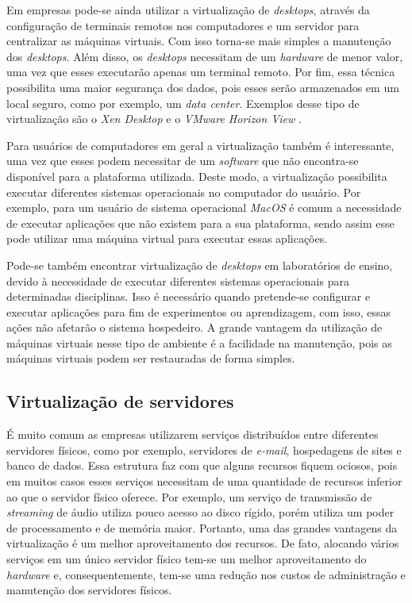 Em empresas pode-se ainda utilizar a virtualização de \textit{desktops}, através da configuração de terminais remotos nos computadores e um 
servidor para centralizar as máquinas virtuais. Com isso torna-se mais simples a manutenção dos \textit{desktops}. Além disso, os \textit{desktops} 
necessitam de um \textit{hardware} de menor valor, uma vez que esses executarão apenas um terminal remoto. Por fim, essa técnica possibilita uma 
maior segurança dos dados, pois esses serão armazenados em um local seguro, como por exemplo, um \textit{data center}. Exemplos desse tipo de 
virtualização são o \textit{Xen Desktop} \cite{xendesktop} e o \textit{VMware Horizon View} \cite{vmwareview}.

Para usuários de computadores em geral a virtualização também é interessante, uma vez que esses podem necessitar de um \textit{software} que não
encontra-se disponível para a plataforma utilizada. Deste modo, a virtualização possibilita executar diferentes sistemas operacionais no computador do 
usuário. Por exemplo, para um usuário de sistema operacional \textit{MacOS} é comum a necessidade de executar aplicações que não existem para a 
sua plataforma, sendo assim esse pode utilizar uma máquina virtual para executar essas aplicações.

Pode-se também encontrar virtualização de \textit{desktops} em laboratórios de ensino, devido à necessidade de executar diferentes sistemas 
operacionais para determinadas disciplinas. Isso é necessário quando pretende-se configurar e executar aplicações para fim de experimentos ou
aprendizagem, com isso, essas ações não afetarão o sistema hospedeiro. A grande vantagem da utilização de máquinas virtuais nesse tipo de 
ambiente é a facilidade na manutenção, pois as máquinas virtuais podem ser restauradas de forma simples.

\subsection{Virtualização de servidores}
\label{section:virtserv}

É muito comum as empresas utilizarem serviços distribuídos entre diferentes servidores físicos, como por exemplo, servidores de \textit{e-mail}, 
hospedagens de sites e banco de dados. Essa estrutura faz com que alguns recursos fiquem ociosos, pois em muitos casos esses serviços necessitam 
de uma quantidade de recursos inferior ao que o servidor físico oferece. Por exemplo, um serviço de transmissão de \textit{streaming} de áudio 
utiliza pouco acesso ao disco rígido, porém utiliza um poder de processamento e de memória  maior. Portanto, uma das grandes vantagens da 
virtualização é um melhor aproveitamento dos recursos. De fato, alocando vários serviços em um único servidor físico tem-se um melhor 
aproveitamento do \textit{hardware} \cite{moreira2006} e, consequentemente, tem-se uma redução nos custos de administração e manutenção 
dos servidores físicos.

